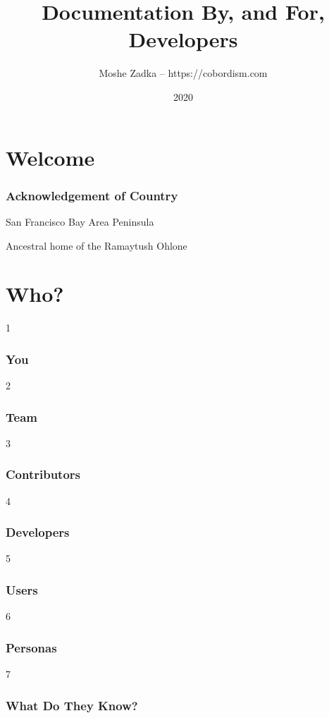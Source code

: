 \usepackage{hyperref}
\usepackage{graphicx}
\usepackage{listings}
\usepackage{textcomp}
\usepackage{fancyvrb}

\title{Documentation By, and For, Developers}
\author{Moshe Zadka -- https://cobordism.com}
\date{2020}


\begin{titlepage}
\maketitle
\end{titlepage}

\section{Welcome}

\frame{\titlepage}

\begin{frame}
\frametitle{Acknowledgement of Country}

San Francisco Bay Area Peninsula

Ancestral home of the Ramaytush Ohlone

\end{frame}

\section{Who?}

1
\begin{frame}
\frametitle{You}
\end{frame}

2
\begin{frame}
\frametitle{Team}
\end{frame}

3
\begin{frame}
\frametitle{Contributors}
\end{frame}

4
\begin{frame}
\frametitle{Developers}
\end{frame}

5
\begin{frame}
\frametitle{Users}
\end{frame}

6
\begin{frame}
\frametitle{Personas}
\end{frame}

7
\begin{frame}
\frametitle{What Do They Know?}
\end{frame}

